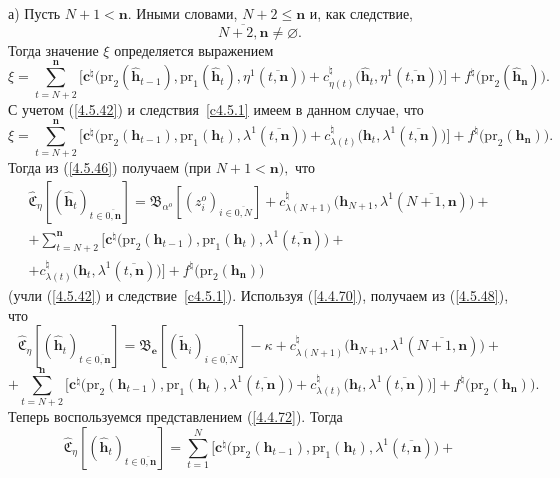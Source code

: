 \documentclass[11pt,twoside,openany]{report}
\newcommand{\ov}{\overline}
\newcommand{\la}{\lambda}
\newcommand{\al}{\alpha}
\newcommand{\emp}{\varnothing}
\begin{document}
{{а) Пусть $N+1 <\mathbf{n}.$ Иными словами, $N+2\leqslant \mathbf{n}$ и, как следствие,
$$
\ov{N+2,\mathbf{n}}\neq \emp.
$$
Тогда значение $\xi$ определяется выражением
$$
\xi = \sum\limits_{t=N+2}^\mathbf{n}\bigl[\mathbf{c}^\natural\bigl(\mathrm{pr}_2(\hat{\mathbf{h}}_{t-1}),
\mathrm{pr}_1(\hat{\mathbf{h}}_t),\eta^1(\ov{t,\mathbf{n}})\bigl) +
c_{\eta(t)}^\natural\bigl(\hat{\mathbf{h}}_t,\eta^1(\ov{t,\mathbf{n}})\bigl)\bigl] +
f^\natural\bigl(\mathrm{pr}_2(\hat{\mathbf{h}}_\mathbf{n})\bigl).
$$
С учетом (\ref{4.5.42}) и следствия~\ref{c4.5.1} имеем в данном случае, что
$$
\xi = \sum\limits_{t=N+2}^\mathbf{n}\bigl[\mathbf{c}^\natural\bigl(\mathrm{pr}_2(\mathbf{h}_{t-1}),
\mathrm{pr}_1(\mathbf{h}_t),\la^1(\ov{t,\mathbf{n}})\bigl) +
c_{\la(t)}^\natural\bigl(\mathbf{h}_t,\la^1(\ov{t,\mathbf{n}})\bigl)\bigl] +
f^\natural\bigl(\mathrm{pr}_2(\mathbf{h}_\mathbf{n})\bigl).
$$
Тогда из (\ref{4.5.46}) получаем (при $N+1 < \mathbf{n}),$ что
\begin{eqnarray}
&\widehat{\mathfrak{C}}_\eta[(\hat{\mathbf{h}}_t)_{t\in\ov{0,\mathbf{n}}}] =
\mathfrak{B}_{\al^o}[(z_i^o)_{i\in\ov{0,N}}] +
c_{\la(N+1)}^\natural\bigl(\mathbf{h}_{N+1},\la^1(\ov{N+1,\mathbf{n}})\bigl)  +
&\nonumber\\
&+ \sum\limits_{t=N+2}^\mathbf{n}\bigl[\mathbf{c}^\natural\bigl(\mathrm{pr}_2(\mathbf{h}_{t-1}),
\mathrm{pr}_1(\mathbf{h}_t),\la^1(\ov{t,\mathbf{n}})\bigl) +
&\nonumber\\
&+ c_{\la(t)}^\natural\bigl(\mathbf{h}_t,\la^1(\ov{t,\mathbf{n}})\bigl)\bigl] +
f^\natural\bigl(\mathrm{pr}_2(\mathbf{h}_\mathbf{n})\bigl)
&\label{4.5.48}
\end{eqnarray}
(учли (\ref{4.5.42}) и следствие~\ref{c4.5.1}).  Используя (\ref{4.4.70}),
получаем из (\ref{4.5.48}), что
$$
\widehat{\mathfrak{C}}_\eta[(\hat{\mathbf{h}}_t)_{t\in\ov{0,\mathbf{n}}}] =
\mathfrak{B}_\mathbf{e}[(\tilde{\mathbf{h}}_i)_{i\in\ov{0,N}}] -\kappa +
c_{\la(N+1)}^\natural\bigl(\mathbf{h}_{N+1},\la^1(\ov{N+1,\mathbf{n}})\bigl) +
$$
$$
+ \sum\limits_{t=N+2}^\mathbf{n}\bigl[\mathbf{c}^\natural\bigl(\mathrm{pr}_2(\mathbf{h}_{t-1}),
\mathrm{pr}_1(\mathbf{h}_t),\la^1(\ov{t,\mathbf{n}})\bigl) +
c_{\la(t)}^\natural\bigl(\mathbf{h}_t,\la^1(\ov{t,\mathbf{n}})\bigl)\bigl] +
f^\natural\bigl(\mathrm{pr}_2(\mathbf{h}_\mathbf{n})\bigl).
$$
Теперь воспользуемся  представлением (\ref{4.4.72}). Тогда
$$
\widehat{\mathfrak{C}}_\eta[(\hat{\mathbf{h}}_t)_{t\in\ov{0,\mathbf{n}}}] =
\sum\limits_{t=1}^N\bigl[\mathbf{c}^\natural\bigl(\mathrm{pr}_2(\mathbf{h}_{t-1}),
\mathrm{pr}_1(\mathbf{h}_t),\la^1(\ov{t,\mathbf{n}})\bigl) +
$$}}
\end{document}
